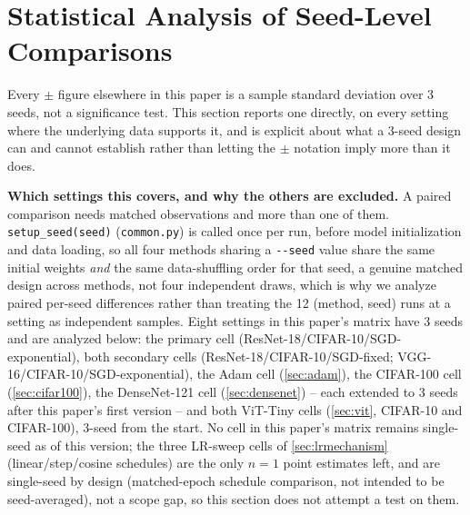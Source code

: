 \documentclass{article}
\theoremstyle{plain}
\theoremstyle{definition}
\theoremstyle{remark}
\begin{document}
\section{Statistical Analysis of Seed-Level Comparisons}
\label{app:stats}

Every $\pm$ figure elsewhere in this paper is a sample standard deviation over 3 seeds, not a significance test. This section reports one directly, on every setting where the underlying data supports it, and is explicit about what a 3-seed design can and cannot establish rather than letting the $\pm$ notation imply more than it does.

\textbf{Which settings this covers, and why the others are excluded.} A paired comparison needs matched observations and more than one of them. \texttt{setup\_seed(seed)} (\texttt{common.py}) is called once per run, before model initialization and data loading, so all four methods sharing a \texttt{-{}-seed} value share the same initial weights \emph{and} the same data-shuffling order for that seed, a genuine matched design across methods, not four independent draws, which is why we analyze paired per-seed differences rather than treating the 12 (method, seed) runs at a setting as independent samples. Eight settings in this paper's matrix have 3 seeds and are analyzed below: the primary cell (ResNet-18/CIFAR-10/SGD-exponential), both secondary cells (ResNet-18/CIFAR-10/SGD-fixed; VGG-16/CIFAR-10/SGD-exponential), the Adam cell (\cref{sec:adam}), the CIFAR-100 cell (\cref{sec:cifar100}), the DenseNet-121 cell (\cref{sec:densenet}) -- each extended to 3 seeds after this paper's first version -- and both ViT-Tiny cells (\cref{sec:vit}, CIFAR-10 and CIFAR-100), 3-seed from the start. No cell in this paper's matrix remains single-seed as of this version; the three LR-sweep cells of \cref{sec:lrmechanism} (linear/step/cosine schedules) are the only $n{=}1$ point estimates left, and are single-seed by design (matched-epoch schedule comparison, not intended to be seed-averaged), not a scope gap, so this section does not attempt a test on them.
\end{document}
